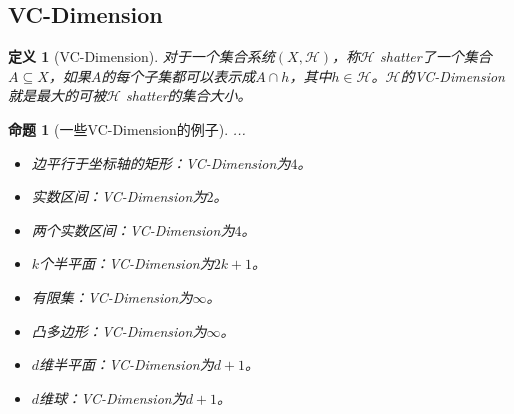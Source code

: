 \documentclass[8pt]{article}
\theoremstyle{compact}
\newtheorem{definition}{定义}
\newtheorem{proposition}{命题}
\begin{document}
\subsection{VC-Dimension}
\begin{definition}[VC-Dimension]
	对于一个集合系统$(X, \mathcal H)$，称$\mathcal H$ shatter了一个集合$A \subseteq X$，如果$A$的每个子集都可以表示成$A \cap h$，其中$h \in \mathcal H$。$\mathcal H$的VC-Dimension就是最大的可被$\mathcal H$ shatter的集合大小。
\end{definition}
\begin{proposition}[一些VC-Dimension的例子]{\color{white}...}
	\begin{itemize}
		\item 边平行于坐标轴的矩形：VC-Dimension为$4$。
		\item 实数区间：VC-Dimension为$2$。
		\item 两个实数区间：VC-Dimension为$4$。
		\item $k$个半平面：VC-Dimension为$2k+1$。
		\item 有限集：VC-Dimension为$\infty$。
		\item 凸多边形：VC-Dimension为$\infty$。
		\item $d$维半平面：VC-Dimension为$d+1$。
		\item $d$维球：VC-Dimension为$d+1$。
	\end{itemize}
\end{proposition}
\end{document}
